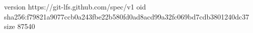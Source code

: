 version https://git-lfs.github.com/spec/v1
oid sha256:f79821a9077ccb0a243fbe22b580fd0ad8acd99a32fc069bd7cdb3801240dc37
size 87540
